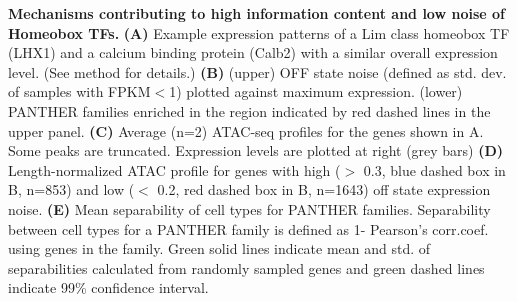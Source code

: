 \textbf{Mechanisms contributing to high information content and low noise of Homeobox TFs.}
\textbf{(A)} Example expression patterns of a Lim class homeobox TF (LHX1) and a calcium binding protein (Calb2) with a similar overall expression level. 
(See method for details.)
\textbf{(B)} (upper) OFF state noise (defined as std. dev. of samples with FPKM$<$1) plotted against maximum expression. (lower) PANTHER families enriched in the region indicated by red dashed lines in the upper panel.
\textbf{(C)} Average (n=2) ATAC-seq profiles for the genes shown in A. Some peaks are truncated. Expression levels are plotted at right (grey bars)
\textbf{(D)} Length-normalized ATAC profile for genes with high ($>$ 0.3, blue dashed box in B, n=853) and low ($<$ 0.2, red dashed box in B, n=1643) off state expression noise.
\textbf{(E)} Mean separability of cell types for PANTHER families. Separability between cell types for a PANTHER family is defined as 1- Pearson's corr.coef. using genes in the family. Green solid lines indicate mean and std. of separabilities calculated from randomly sampled genes and green dashed lines indicate 99\% confidence interval.   
